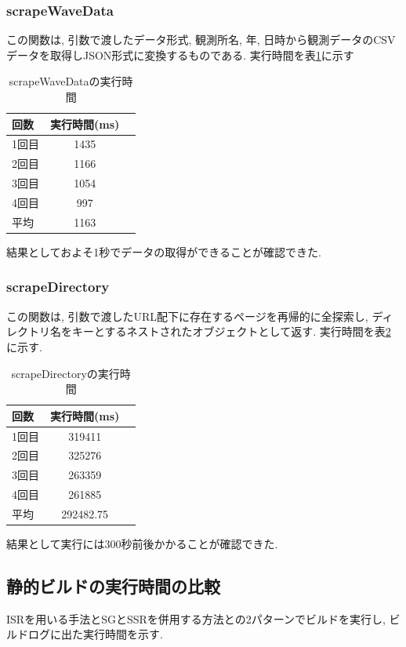 \subsubsection{scrapeWaveData}
この関数は, 引数で渡したデータ形式, 観測所名, 年, 日時から観測データのCSVデータを取得しJSON形式に変換するものである.
実行時間を表\ref{table:scrapeWaveData}に示す

\begin{table}[hbtp]
	\caption{scrapeWaveDataの実行時間}
	\label{table:scrapeWaveData}
	\centering
	\begin{tabular}{lcr}
		\hline
		回数  & 実行時間(ms) \\
		\hline \hline
		1回目 & 1435     \\
		2回目 & 1166     \\
		3回目 & 1054     \\
		4回目 & 997      \\
		\hline
		平均  & 1163
	\end{tabular}
\end{table}

結果としておよそ1秒でデータの取得ができることが確認できた.

\subsubsection{scrapeDirectory}
この関数は, 引数で渡したURL配下に存在するページを再帰的に全探索し, ディレクトリ名をキーとするネストされたオブジェクトとして返す.
実行時間を表\ref{table:scrapeDirectory}に示す.

\begin{table}[hbtp]
	\caption{scrapeDirectoryの実行時間}
	\label{table:scrapeDirectory}
	\centering
	\begin{tabular}{lcr}
		\hline
		回数  & 実行時間(ms)   \\
		\hline \hline
		1回目 & 319411     \\
		2回目 & 325276     \\
		3回目 & 263359     \\
		4回目 & 261885     \\
		\hline
		平均  & 292482.75
	\end{tabular}
\end{table}

結果として実行には300秒前後かかることが確認できた.

\subsection{静的ビルドの実行時間の比較}
ISRを用いる手法とSGとSSRを併用する方法との2パターンでビルドを実行し, ビルドログに出た実行時間を示す.
